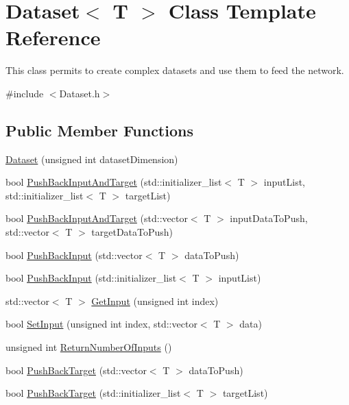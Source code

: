 \hypertarget{class_dataset}{\section{Dataset$<$ T $>$ Class Template Reference}
\label{class_dataset}
}


This class permits to create complex datasets and use them to feed the network.  




{\ttfamily \#include $<$Dataset.\-h$>$}

\subsection*{Public Member Functions}
\begin{DoxyCompactItemize}
\item 
\hyperlink{class_dataset_a3c1d2e0fa826798f46e0e84425f3d577}{Dataset} (unsigned int dataset\-Dimension)
\item 
bool \hyperlink{class_dataset_a6be5cd1a0217450a47895ec191becb8d}{Push\-Back\-Input\-And\-Target} (std\-::initializer\-\_\-list$<$ T $>$ input\-List, std\-::initializer\-\_\-list$<$ T $>$ target\-List)
\item 
bool \hyperlink{class_dataset_af3cf63ef5a12c9c84dd7230ca4c0e4f3}{Push\-Back\-Input\-And\-Target} (std\-::vector$<$ T $>$ input\-Data\-To\-Push, std\-::vector$<$ T $>$ target\-Data\-To\-Push)
\item 
bool \hyperlink{class_dataset_abdbd78b795d4466da2b9435793d18977}{Push\-Back\-Input} (std\-::vector$<$ T $>$ data\-To\-Push)
\item 
bool \hyperlink{class_dataset_add6309542e511497b33667d7244e6993}{Push\-Back\-Input} (std\-::initializer\-\_\-list$<$ T $>$ input\-List)
\item 
std\-::vector$<$ T $>$ \hyperlink{class_dataset_a89d16a207a6852f6fd5585d9c015c3b3}{Get\-Input} (unsigned int index)
\item 
bool \hyperlink{class_dataset_a3ccdc91604800a3a7ee30d05d984e27f}{Set\-Input} (unsigned int index, std\-::vector$<$ T $>$ data)
\item 
unsigned int \hyperlink{class_dataset_a832fcfa74d58b6f896cbe92c9fd77741}{Return\-Number\-Of\-Inputs} ()
\item 
bool \hyperlink{class_dataset_af395132a97084aad5113ab16885f4ad2}{Push\-Back\-Target} (std\-::vector$<$ T $>$ data\-To\-Push)
\item 
bool \hyperlink{class_dataset_a5f9e4e1d76d2100dcf5985f67790d5bb}{Push\-Back\-Target} (std\-::initializer\-\_\-list$<$ T $>$ target\-List)

\end{DoxyCompactItemize}
